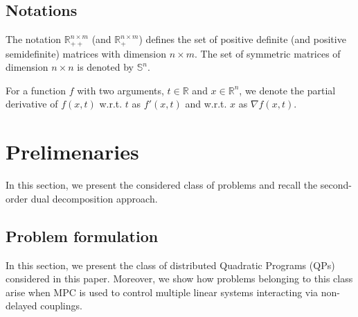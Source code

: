 \subsection{Notations} 
The notation $\mathbb{R}_{++}^{n \times m}$ (and $\mathbb{R}_{+}^{n \times m}$) defines the set of positive definite (and positive semidefinite) matrices with dimension $n \times m$. The set of symmetric matrices of dimension $n \times n$ is denoted by $\mathbb{S}^n$.

For a function $f$ with two arguments, $t \in \mathbb{R}$ and $x \in \mathbb{R}^n$, we denote the partial derivative of $f(x,t)$ w.r.t. $t$ as $f'(x,t)$ and w.r.t. $x$ as $\nabla f(x,t)$.


\section{Prelimenaries} \label{S:Preliminaries}

In this section, we present the considered class of problems and recall the second-order dual decomposition approach.

\subsection{Problem formulation}
In this section, we present the class of distributed Quadratic Programs (QPs) considered in this paper. Moreover, we show how problems belonging to this class arise when MPC is used to control multiple linear systems interacting via non-delayed couplings.

